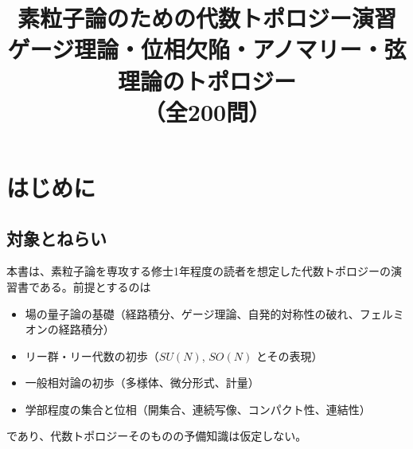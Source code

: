 

\title{
  素粒子論のための代数トポロジー演習\\[1ex]
  \large ゲージ理論・位相欠陥・アノマリー・弦理論のトポロジー\\
  \large （全200問）
}
\author{}
\date{}



\frontmatter
\maketitle
\tableofcontents

\chapter*{はじめに}

\section*{対象とねらい}
本書は、素粒子論を専攻する修士1年程度の読者を想定した代数トポロジーの演習書である。前提とするのは
\begin{itemize}
  \item 場の量子論の基礎（経路積分、ゲージ理論、自発的対称性の破れ、フェルミオンの経路積分）
  \item リー群・リー代数の初歩（$SU(N)$, $SO(N)$ とその表現）
  \item 一般相対論の初歩（多様体、微分形式、計量）
  \item 学部程度の集合と位相（開集合、連続写像、コンパクト性、連結性）
\end{itemize}
であり、代数トポロジーそのものの予備知識は仮定しない。

